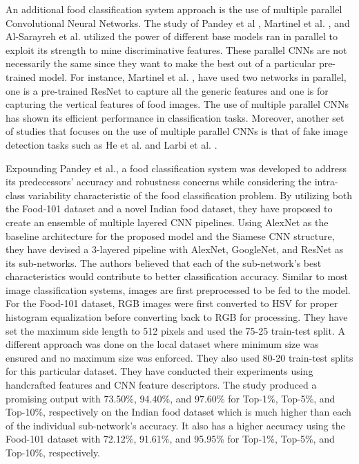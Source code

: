 An additional food classification system approach is the use of multiple parallel Convolutional Neural Networks. The study of Pandey et al \cite{pandey-2017}, Martinel et al. \cite{martinel-2018}, and Al-Sarayreh et al. \cite{al-sarayreh-2018} utilized the power of different base models ran in parallel to exploit its strength to mine discriminative features. These parallel CNNs are not necessarily the same since they want to make the best out of a particular pre-trained model. For instance, Martinel et al. \cite{martinel-2018}, have used two networks in parallel, one is a pre-trained ResNet to capture all the generic features and one is for capturing the vertical features of food images. The use of multiple parallel CNNs has shown its efficient performance in classification tasks. Moreover, another set of studies that focuses on the use of multiple parallel CNNs is that of fake image detection tasks such as He et al. \cite{he-2019} and Larbi et al. \cite{larbi-2018}.

Expounding Pandey et al.\cite{pandey-2017}, a food classification system was developed to address its predecessors' accuracy and robustness concerns while considering the intra-class variability characteristic of the food classification problem. By utilizing both the Food-101 dataset\cite{bossard-2014} and a novel Indian food dataset, they have proposed to create an ensemble of multiple layered CNN pipelines. Using AlexNet as the baseline architecture for the proposed model and the Siamese CNN structure, they have devised a 3-layered pipeline with AlexNet, GoogleNet, and ResNet as its sub-networks. The authors believed that each of the sub-network's best characteristics would contribute to better classification accuracy. Similar to most image classification systems, images are first preprocessed to be fed to the model. For the Food-101 dataset, RGB images were first converted to HSV for proper histogram equalization before converting back to RGB for processing. They have set the maximum side length to 512 pixels and used the 75-25 train-test split. A different approach was done on the local dataset where minimum size was ensured and no maximum size was enforced. They also used 80-20 train-test splits for this particular dataset. They have conducted their experiments using handcrafted features and CNN feature descriptors. The study produced a promising output with 73.50\%, 94.40\%, and 97.60\% for Top-1\%, Top-5\%, and Top-10\%, respectively on the Indian food dataset which is much higher than each of the individual sub-network's accuracy. It also has a higher accuracy using the Food-101 dataset with 72.12\%, 91.61\%, and 95.95\% for Top-1\%, Top-5\%, and Top-10\%, respectively.

